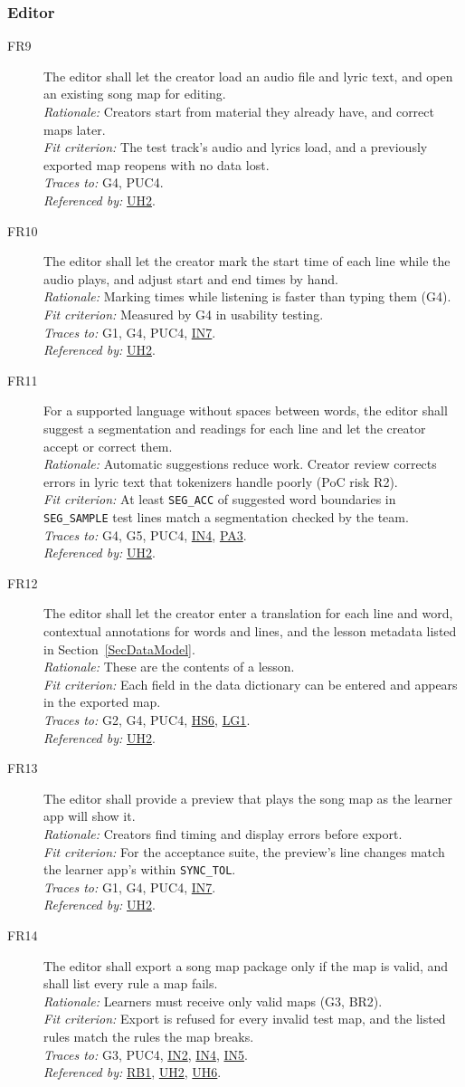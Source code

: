 \documentclass[12pt]{article}
\newcommand{\cn}[1]{\texttt{#1}}
\newcommand{\rat}[1]{\\\textit{Rationale:} #1}
\newcommand{\fit}[1]{\\\textit{Fit criterion:} #1}
\newcommand{\trace}[1]{\\\textit{Traces to:} #1}
\newcommand{\usedby}[1]{\\\textit{Referenced by:} #1}
\newcommand{\reqdef}[1]{\hypertarget{req:#1}{#1}}
\newcommand{\req}[1]{\hyperlink{req:#1}{#1}}
\begin{document}
\subsubsection*{Editor}
\begin{description}
\item[\reqdef{FR9}] The editor shall let the creator load an audio file and lyric text,
and open an existing song map for editing.
\rat{Creators start from material they already have, and correct maps later.}
\fit{The test track's audio and lyrics load, and a previously exported map
reopens with no data lost.}
\trace{G4, PUC4.}
\usedby{\req{UH2}.}

\item[\reqdef{FR10}] The editor shall let the creator mark the start time of each line
while the audio plays, and adjust start and end times by hand.
\rat{Marking times while listening is faster than typing them (G4).}
\fit{Measured by G4 in usability testing.}
\trace{G1, G4, PUC4, \req{IN7}.}
\usedby{\req{UH2}.}

\item[\reqdef{FR11}] For a supported language without spaces between words, the editor
shall suggest a segmentation and readings for each line and let the creator
accept or correct them.
\rat{Automatic suggestions reduce work. Creator review corrects errors in lyric
text that tokenizers handle poorly (PoC risk R2).}
\fit{At least \cn{SEG\_ACC} of suggested word boundaries in
\cn{SEG\_SAMPLE} test lines match a segmentation checked by the team.}
\trace{G4, G5, PUC4, \req{IN4}, \req{PA3}.}
\usedby{\req{UH2}.}

\item[\reqdef{FR12}] The editor shall let the creator enter a translation for each line
and word, contextual annotations for words and lines, and the lesson metadata
listed in Section~\ref{SecDataModel}.
\rat{These are the contents of a lesson.}
\fit{Each field in the data dictionary can be entered and appears in the
exported map.}
\trace{G2, G4, PUC4, \req{HS6}, \req{LG1}.}
\usedby{\req{UH2}.}

\item[\reqdef{FR13}] The editor shall provide a preview that plays the song map as the
learner app will show it.
\rat{Creators find timing and display errors before export.}
\fit{For the acceptance suite, the preview's line changes match the learner
app's within \cn{SYNC\_TOL}.}
\trace{G1, G4, PUC4, \req{IN7}.}
\usedby{\req{UH2}.}

\item[\reqdef{FR14}] The editor shall export a song map package only if the map is valid,
and shall list every rule a map fails.
\rat{Learners must receive only valid maps (G3, BR2).}
\fit{Export is refused for every invalid test map, and the listed rules match
the rules the map breaks.}
\trace{G3, PUC4, \req{IN2}, \req{IN4}, \req{IN5}.}
\usedby{\req{RB1}, \req{UH2}, \req{UH6}.}


\end{description}
\end{document}
